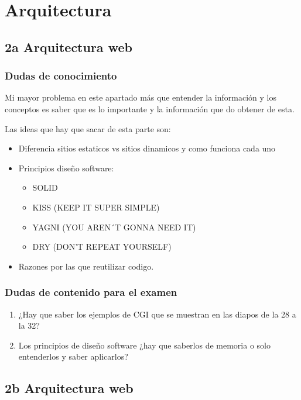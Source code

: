 \chapter{Arquitectura}
\section*{2a Arquitectura web}
\subsection*{Dudas de conocimiento}
Mi mayor problema en este apartado más que entender la información y los conceptos es saber que es lo importante y la información que do obtener de esta.


Las ideas que hay que sacar de esta parte son:
\begin{itemize}
    \item  Diferencia sitios estaticos vs sitios dinamicos y como funciona cada uno 
    \item Principios diseño software: \begin{itemize}
        \item SOLID
        \item KISS (KEEP IT SUPER SIMPLE)
        \item YAGNI (YOU AREN´T GONNA NEED IT)
        \item DRY (DON'T REPEAT YOURSELF)
    \end{itemize}
    \item  Razones por las que reutilizar codigo. 
\end{itemize}
\subsection*{Dudas de contenido para el examen}
\begin{enumerate}
    \item ¿Hay que saber los ejemplos de CGI que se muestran en las diapos de la 28 a la 32?
    \item Los principios de diseño software ¿hay que saberlos de memoria o solo entenderlos y saber aplicarlos?
\end{enumerate}



\section*{2b Arquitectura web}
